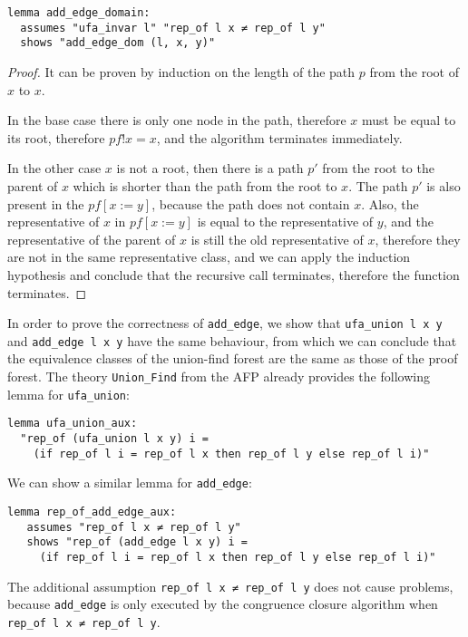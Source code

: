 \begin{lstlisting}
lemma add_edge_domain:
  assumes "ufa_invar l" "rep_of l x ≠ rep_of l y"
  shows "add_edge_dom (l, x, y)"
\end{lstlisting}

\begin{proof}
It can be proven by induction on the length of the path $p$ from the root of $x$ to $x$.

In the base case there is only one node in the path, therefore $x$ must be equal to its root, therefore $pf ! x = x$, and the algorithm terminates immediately.

In the other case $x$ is not a root, then there is a path $p'$ from the root to the parent of $x$ which is shorter than the path from the root to $x$. The path $p'$ is also present in the $pf[x := y]$, because the path does not contain $x$. Also, the representative of $x$ in $pf[x := y]$ is equal to the representative of $y$, and the representative of the parent of $x$ is still the old representative of $x$, therefore they are not in the same representative class, and we can apply the induction hypothesis and conclude that the recursive call terminates, therefore the function terminates.
\end{proof}

In order to prove the correctness of \lstinline|add_edge|, we show that \lstinline{ufa_union l x y} and \lstinline{add_edge l x y} have the same behaviour, from which we can conclude that the equivalence classes of the union-find forest are the same as those of the proof forest. The theory \lstinline{Union_Find} from the AFP \cite{Sep} already provides the following lemma for \lstinline{ufa_union}:

\begin{lstlisting}
lemma ufa_union_aux:
  "rep_of (ufa_union l x y) i =
    (if rep_of l i = rep_of l x then rep_of l y else rep_of l i)"
\end{lstlisting}

We can show a similar lemma for \lstinline{add_edge}:

\begin{lstlisting}
lemma rep_of_add_edge_aux:
   assumes "rep_of l x ≠ rep_of l y"
   shows "rep_of (add_edge l x y) i =
     (if rep_of l i = rep_of l x then rep_of l y else rep_of l i)"
\end{lstlisting}

The additional assumption \lstinline{rep_of l x ≠ rep_of l y} does not cause problems, because \lstinline{add_edge} is only executed by the congruence closure algorithm when \lstinline{rep_of l x ≠ rep_of l y}.

